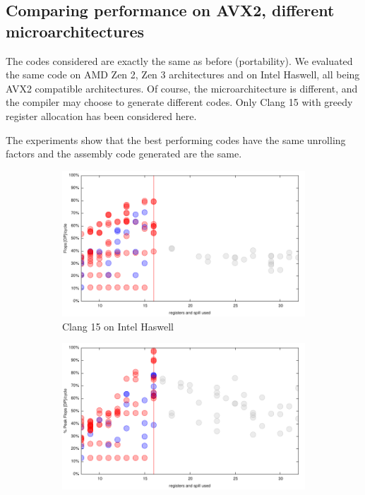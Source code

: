 \documentclass{article}
\begin{document}
\subsection{Comparing performance on AVX2, different microarchitectures}
The codes considered are exactly the same as before (portability). We evaluated the same code on AMD Zen 2, Zen 3 architectures and on Intel Haswell, all being AVX2 compatible architectures. Of course, the microarchitecture is different, and the compiler may choose to generate different codes. Only Clang 15 with greedy register allocation has been considered here. 

The experiments show that the best performing codes have the same unrolling factors and the assembly code generated are the same. 
\begin{figure}[h!]
  \begin{subfigure}[h]{0.45\textwidth}
  \includegraphics[width=\textwidth]{../benches/gemm/haswell-64x256x64/greedy.pdf}
  \caption{Clang 15 on Intel Haswell}
  \end{subfigure}
  \begin{subfigure}[h]{0.45\textwidth}  
\includegraphics[width=\textwidth]{../benches/gemm/zen3-64x256x64/greedy.pdf}

\end{subfigure}
\end{figure}
\end{document}
